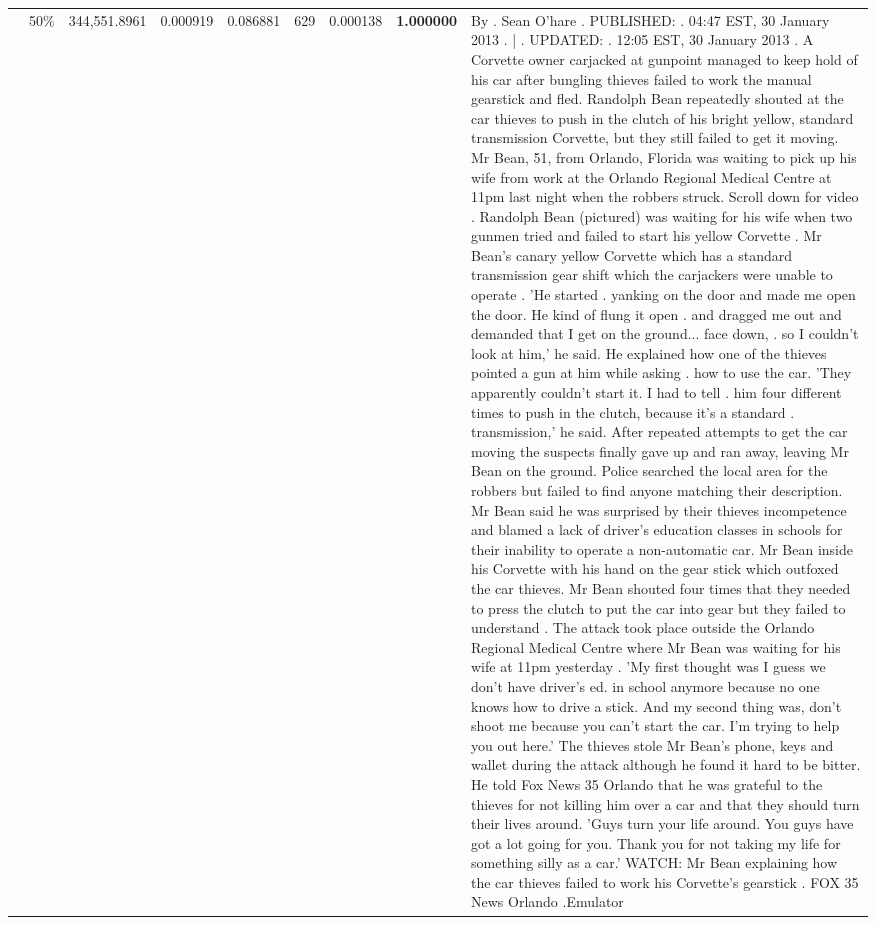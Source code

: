 \begin{table}[H]
\begin{tabular}{llrrrrrrl}
 & 50\% & 344,551.8961 & 0.000919 & 0.086881 & \color{red} 629 & 0.000138 & \bfseries \color{red} 1.000000 & By . Sean O'hare . PUBLISHED: . 04:47 EST, 30 January 2013 . | . UPDATED: . 12:05 EST, 30 January 2013 . A Corvette owner carjacked at gunpoint managed to keep hold of his car after bungling thieves failed to work the manual gearstick and fled. Randolph Bean repeatedly shouted at the car thieves to push in the clutch of his bright yellow, standard transmission Corvette, but they still failed to get it moving. Mr Bean, 51, from Orlando, Florida was waiting to pick up his wife from work at the Orlando Regional Medical Centre at 11pm last night when the robbers struck. Scroll down for video . Randolph Bean (pictured) was waiting for his wife when two gunmen tried and failed to start his yellow Corvette . Mr Bean's canary yellow Corvette which has a standard transmission gear shift which the carjackers were unable to operate . 'He started . yanking on the door and made me open the door. He kind of flung it open . and dragged me out and demanded that I get on the ground... face down, . so I couldn't look at him,' he said. He explained how one of the thieves pointed a gun at him while asking . how to use the car. 'They apparently couldn't start it. I had to tell . him four different times to push in the clutch, because it's a standard . transmission,' he said. After repeated attempts to get the car moving the suspects finally gave up and ran away, leaving Mr Bean on the ground. Police searched the local area for the robbers but failed to find anyone matching their description. Mr Bean said he was surprised by their thieves incompetence and blamed a lack of driver's education classes in schools for their inability to operate a non-automatic car. Mr Bean inside his Corvette with his hand on the gear stick which outfoxed the car thieves. Mr Bean shouted four times that they needed to press the clutch to put the car into gear but they failed to understand . The attack took place outside the Orlando Regional Medical Centre where Mr Bean was waiting for his wife at 11pm yesterday . 'My first thought was I guess we don't have driver's ed. in school anymore because no one knows how to drive a stick. And my second thing was, don't shoot me because you can't start the car. I'm trying to help you out here.' The thieves stole Mr Bean's phone, keys and wallet during the attack although he found it hard to be bitter. He told Fox News 35 Orlando that he was grateful to the thieves for not killing him over a car and that they should turn their lives around. 'Guys turn your life around. You guys have got a lot going for you. Thank you for not taking my life for something silly as a car.' WATCH: Mr Bean explaining how the car thieves failed to work his Corvette's gearstick . FOX 35 News Orlando .Emulator \\

\end{tabular}
\end{table}
